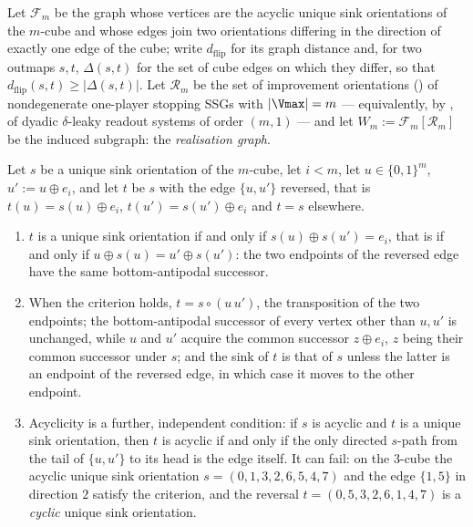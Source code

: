 
\begin{definition}\label{mw:def-graph}
Let $\mathcal F_m$ be the graph whose vertices are the acyclic unique sink
orientations of the $m$-cube and whose edges join two orientations differing
in the direction of exactly one edge of the cube; write $d_{\mathrm{flip}}$
for its graph distance and, for two outmaps $s,t$, $\Delta(s,t)$ for the set
of cube edges on which they differ, so that
$d_{\mathrm{flip}}(s,t)\ge|\Delta(s,t)|$. Let $\mathcal R_m$ be the set of
improvement orientations () of nondegenerate
one-player stopping SSGs with $|\Vmax|=m$ --- equivalently, by
, of dyadic $\delta$-leaky readout systems of order
$(m,1)$ --- and let $W_m:=\mathcal F_m[\mathcal R_m]$ be the induced subgraph:
the \emph{realisation graph}.
\end{definition}

\begin{theorem}\label{mw:flip}
Let $s$ be a unique sink orientation of the $m$-cube, let $i<m$, let
$u\in\{0,1\}^m$, $u':=u\oplus e_i$, and let $t$ be $s$ with the edge
$\{u,u'\}$ reversed, that is
$t(u)=s(u)\oplus e_i$, $t(u')=s(u')\oplus e_i$ and $t=s$ elsewhere.
\begin{enumerate}[label=(\alph*),leftmargin=2.2em]
\item $t$ is a unique sink orientation if and only if
      $s(u)\oplus s(u')=e_i$, that is if and only if
      $u\oplus s(u)=u'\oplus s(u')$: the two endpoints of the reversed edge
      have the same bottom-antipodal successor.
\item When the criterion holds, $t=s\circ(u\,u')$, the transposition of the
      two endpoints; the bottom-antipodal successor of every vertex other
      than $u,u'$ is unchanged, while $u$ and $u'$ acquire the common
      successor $z\oplus e_i$, $z$ being their common successor under $s$;
      and the sink of $t$ is that of $s$ unless the latter is an endpoint of
      the reversed edge, in which case it moves to the other endpoint.
\item Acyclicity is a further, independent condition: if $s$ is acyclic and
      $t$ is a unique sink orientation, then $t$ is acyclic if and only if
      the only directed $s$-path from the tail of $\{u,u'\}$ to its head is
      the edge itself. It can fail: on the $3$-cube the acyclic unique sink
      orientation $s=(0,1,3,2,6,5,4,7)$ and the edge $\{1,5\}$ in direction
      $2$ satisfy the criterion, and the reversal
      $t=(0,5,3,2,6,1,4,7)$ is a \emph{cyclic} unique sink orientation.
\end{enumerate}
\end{theorem}

